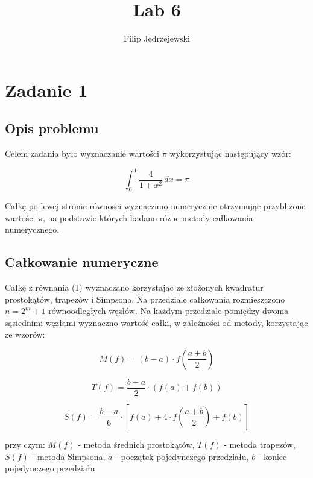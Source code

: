 \documentclass{article}
\title{Lab 6}
\author{Filip Jędrzejewski}
\begin{document}
	\maketitle
	
	\section*{Zadanie 1}
	
	\subsection*{Opis problemu}
	
	Celem zadania było wyznaczanie wartości $\pi$ wykorzystując następujący wzór:

	\begin{equation}
		\int_{0}^{1} \frac{4}{1 + x^2} \,dx = \pi
	\end{equation}

	Całkę po lewej stronie równosci wyznaczano numerycznie otrzymując przybliżone wartości $\pi$, na podstawie których badano różne metody całkowania numerycznego.	
	

	\subsection*{Całkowanie numeryczne}

	Całkę z równania (1) wyznaczano korzystając ze złożonych kwadratur prostokątów, trapezów i Simpsona. Na przedziale całkowania rozmieszczono $n = 2^m+1$ równoodległych węzłów.
	Na każdym przedziale pomiędzy dwoma sąsiednimi węzłami wyznaczno wartość całki, w zależności od metody, korzystając ze wzorów:

	\begin{equation}
		M(f) = (b-a) \cdot f \left(\frac{a+b}{2}\right)
	\end{equation}

	\begin{equation}
		T(f) = \frac{b-a}{2} \cdot (f(a) + f(b))
	\end{equation}

	\begin{equation}
		S(f) = \frac{b-a}{6} \cdot \left[ f(a) + 4 \cdot f \left(\frac{a+b}{2}\right) + f(b)\right]
	\end{equation}

	przy czym: $M(f)$ - metoda średnich prostokątów, $T(f)$ - metoda trapezów, $S(f)$ - metoda Simpsona, $a$ - początek pojedynczego przedziału, $b$ - koniec pojedynczego przedziału. 
	
\end{document}
